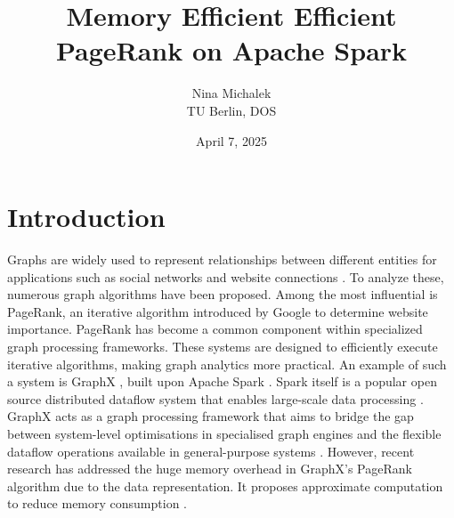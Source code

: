 \documentclass[a4paper,12pt]{article}
\title{Memory Efficient Efficient PageRank on Apache Spark}
\author{Nina Michalek\\TU Berlin, DOS}
\date{April 7, 2025}
\begin{document}
\maketitle


\section{Introduction}
 Graphs are widely used to represent relationships between different entities for applications such as social networks and website connections \cite{zhang_distributed_2021}. 
To analyze these, numerous graph algorithms have been proposed. Among the most influential is PageRank, an iterative algorithm introduced by Google to determine website importance. PageRank has become a common component within specialized graph processing frameworks. These systems are designed to efficiently execute iterative algorithms, making graph analytics more practical. An example of such a system is GraphX \cite{xin_graphx_2013}, built upon Apache Spark \cite{xin_graphx_2013}. Spark itself is a popular open source distributed dataflow system that enables large-scale data processing \cite{shanahan_large_2015}. GraphX acts as a graph processing framework that aims to bridge the gap between system-level optimisations in specialised graph engines and the flexible dataflow operations available in general-purpose systems \cite{jin_software_2022}. However, recent research has addressed the huge memory overhead in GraphX's PageRank algorithm due to the data representation. It proposes approximate computation to reduce memory consumption \cite{wu_efficient_2024}. 
 
\end{document}
